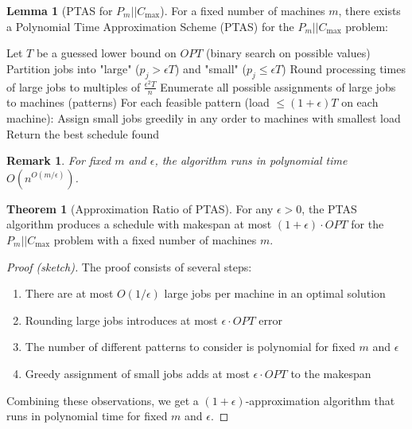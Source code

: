 \documentclass{article}
\newtheorem{remark}{Remark}
\theoremstyle{definition}
\newtheorem{theorem}{Theorem}
\newtheorem{lemma}{Lemma}
\begin{document}
\begin{lemma}[PTAS for $P_m||C_{\max}$]
For a fixed number of machines $m$, there exists a Polynomial Time Approximation Scheme (PTAS) for the $P_m||C_{\max}$ problem:

\begin{algorithm}
\caption{PTAS for $P_m||C_{\max}$}
\begin{algorithmic}[1]
    \State Let $T$ be a guessed lower bound on $OPT$ (binary search on possible values)
    \State Partition jobs into "large" ($p_j > \epsilon T$) and "small" ($p_j \leq \epsilon T$)
    \State Round processing times of large jobs to multiples of $\frac{\epsilon^2 T}{n}$
    \State Enumerate all possible assignments of large jobs to machines (patterns)
    \State For each feasible pattern (load $\leq (1+\epsilon)T$ on each machine):
    \State \quad Assign small jobs greedily in any order to machines with smallest load
    \State Return the best schedule found
\EndProcedure
\end{algorithmic}
\end{algorithm}

\begin{remark}
For fixed $m$ and $\epsilon$, the algorithm runs in polynomial time $O(n^{O(m/\epsilon)})$.
\end{remark}
\end{lemma}

\begin{theorem}[Approximation Ratio of PTAS]
For any $\epsilon > 0$, the PTAS algorithm produces a schedule with makespan at most $(1+\epsilon) \cdot OPT$ for the $P_m||C_{\max}$ problem with a fixed number of machines $m$.
\begin{proof}[Proof (sketch)]
The proof consists of several steps:
\begin{enumerate}
    \item There are at most $O(1/\epsilon)$ large jobs per machine in an optimal solution
    \item Rounding large jobs introduces at most $\epsilon \cdot OPT$ error
    \item The number of different patterns to consider is polynomial for fixed $m$ and $\epsilon$
    \item Greedy assignment of small jobs adds at most $\epsilon \cdot OPT$ to the makespan
\end{enumerate}

Combining these observations, we get a $(1+\epsilon)$-approximation algorithm that runs in polynomial time for fixed $m$ and $\epsilon$.
\end{proof}
\end{theorem}
\end{document}
